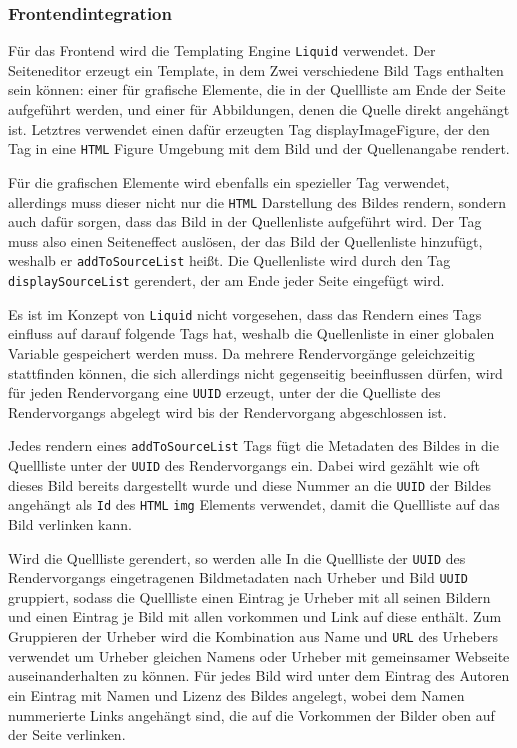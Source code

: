 \subsubsection{Frontendintegration}

Für das Frontend wird die Templating Engine \texttt{Liquid} verwendet. Der
Seiteneditor erzeugt ein Template, in dem Zwei verschiedene Bild Tags enthalten
sein können: einer für grafische Elemente, die in der Quellliste am Ende der
Seite aufgeführt werden, und einer für Abbildungen, denen die Quelle direkt
angehängt ist. Letztres verwendet einen dafür erzeugten Tag displayImageFigure,
der den Tag in eine \texttt{HTML} Figure Umgebung mit dem Bild und der
Quellenangabe rendert.

Für die grafischen Elemente wird ebenfalls ein spezieller Tag verwendet,
allerdings muss dieser nicht nur die \texttt{HTML} Darstellung des Bildes
rendern, sondern auch dafür sorgen, dass das Bild in der Quellenliste aufgeführt
wird. Der Tag muss also einen Seiteneffect auslösen, der das Bild der
Quellenliste hinzufügt, weshalb er \texttt{addToSourceList} heißt. Die
Quellenliste wird durch den Tag \texttt{displaySourceList} gerendert, der am
Ende jeder Seite eingefügt wird.

Es ist im Konzept von \texttt{Liquid} nicht vorgesehen, dass das Rendern eines
Tags einfluss auf darauf folgende Tags hat, weshalb die Quellenliste in einer
globalen Variable gespeichert werden muss. Da mehrere Rendervorgänge
geleichzeitig stattfinden können, die sich allerdings nicht gegenseitig
beeinflussen dürfen, wird für jeden Rendervorgang eine \texttt{UUID} erzeugt,
unter der die Quelliste des Rendervorgangs abgelegt wird bis der Rendervorgang
abgeschlossen ist.

Jedes rendern eines \texttt{addToSourceList} Tags fügt die Metadaten des Bildes
in die Quellliste unter der \texttt{UUID} des Rendervorgangs ein. Dabei wird
gezählt wie oft dieses Bild bereits dargestellt wurde und diese Nummer an die
\texttt{UUID} der Bildes angehängt als \texttt{Id} des \texttt{HTML}
\texttt{img} Elements verwendet, damit die Quellliste auf das Bild verlinken
kann.

Wird die Quellliste gerendert, so werden alle In die Quellliste der
\texttt{UUID} des Rendervorgangs eingetragenen Bildmetadaten nach Urheber und
Bild \texttt{UUID} gruppiert, sodass die Quellliste einen Eintrag je Urheber mit
all seinen Bildern und einen Eintrag je Bild mit allen vorkommen und Link auf
diese enthält. Zum Gruppieren der Urheber wird die Kombination aus Name und
\texttt{URL} des Urhebers verwendet um Urheber gleichen Namens oder Urheber mit
gemeinsamer Webseite auseinanderhalten zu können. Für jedes Bild wird unter dem
Eintrag des Autoren ein Eintrag mit Namen und Lizenz des Bildes angelegt, wobei
dem Namen nummerierte Links angehängt sind, die auf die Vorkommen der Bilder
oben auf der Seite verlinken.

